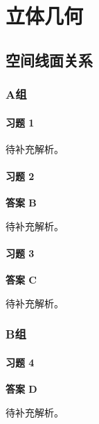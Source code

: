 \chapter{立体几何}

\section{空间线面关系}

\subsection*{A组}

\subsubsection*{习题 1}
\begin{solution}
	待补充解析。
\end{solution}

\subsubsection*{习题 2}
\begin{solution}
	\textbf{答案 B}

	待补充解析。
\end{solution}

\subsubsection*{习题 3}
\begin{solution}
	\textbf{答案 C}

	待补充解析。
\end{solution}

\subsection*{B组}

\subsubsection*{习题 4}
\begin{solution}
	\textbf{答案 D}

	待补充解析。
\end{solution}
